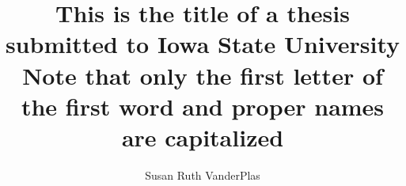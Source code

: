 \title{This is the title of a thesis
submitted to Iowa State University\\
Note that only the first letter of
the first word and proper names
are capitalized}
\author{Susan Ruth VanderPlas}
\notice
\maketitle
